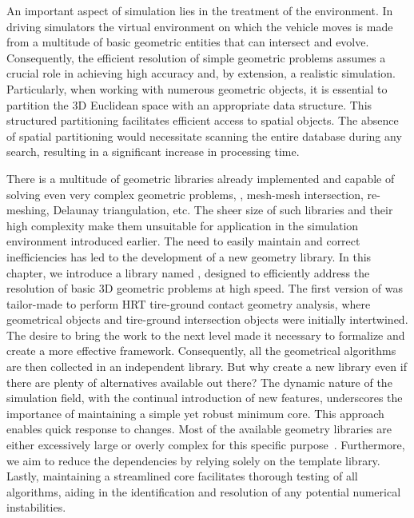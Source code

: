 An important aspect of simulation lies in the treatment of the environment. In driving simulators the virtual environment on which the vehicle moves is made from a multitude of basic geometric entities that can intersect and evolve. Consequently, the efficient resolution of simple geometric problems assumes a crucial role in achieving high accuracy and, by extension, a realistic simulation. Particularly, when working with numerous geometric objects, it is essential to partition the \ac{3D} Euclidean space with an appropriate data structure. This structured partitioning facilitates efficient access to spatial objects. The absence of spatial partitioning would necessitate scanning the entire database during any search, resulting in a significant increase in processing time.

There is a multitude of geometric libraries already implemented and capable of solving even very complex geometric problems, \eg{}, mesh-mesh intersection, re-meshing, Delaunay triangulation, etc. The sheer size of such libraries and their high complexity make them unsuitable for application in the simulation environment introduced earlier. The need to easily maintain and correct inefficiencies has led to the development of a new geometry library. In this chapter, we introduce a \cpp{} library named \Acme{}, designed to efficiently address the resolution of basic \ac{3D} geometric problems at high speed. The first version of \Acme{} was tailor-made to perform \ac{HRT} tire-ground contact geometry analysis, where geometrical objects and tire-ground intersection objects were initially intertwined. The desire to bring the work to the next level made it necessary to formalize and create a more effective framework. Consequently, all the geometrical algorithms are then collected in an independent library. But why create a new library even if there are plenty of alternatives available out there? The dynamic nature of the simulation field, with the continual introduction of new features, underscores the importance of maintaining a simple yet robust minimum core. This approach enables quick response to changes. Most of the available geometry libraries are either excessively large or overly complex for this specific purpose~\cite{cgal2023cgal, libigl2018libigl}. Furthermore, we aim to reduce the dependencies by relying solely on the \cpp{} \Eigen{} template library. Lastly, maintaining a streamlined core facilitates thorough testing of all algorithms, aiding in the identification and resolution of any potential numerical instabilities.

